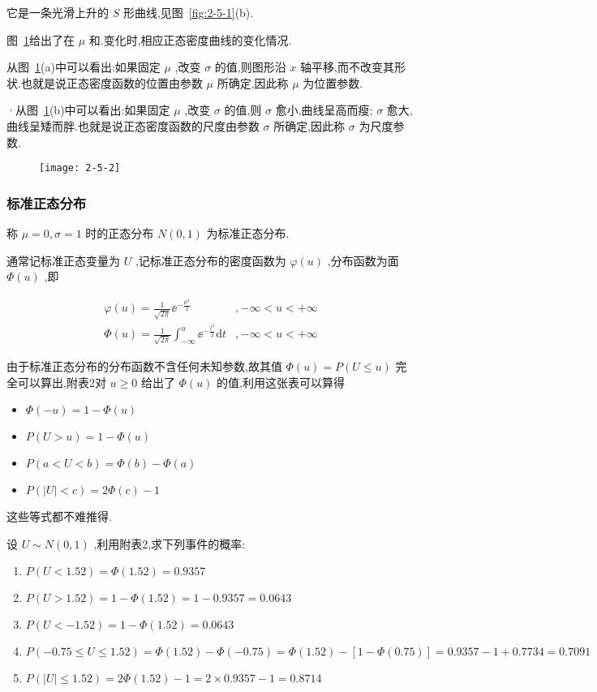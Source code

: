 它是一条光滑上升的 $ S $ 形曲线,见图~\ref{fig:2-5-1}(b).

图~\ref{fig:2-5-2}给出了在 $ \mu $ 和.变化时,相应正态密度曲线的变化情况.

从图~\ref{fig:2-5-2}(a)中可以看出:如果固定 $ \mu $ ,改变 $ \sigma $ 的值,则图形沿 $ x $ 轴平移,而不改变其形状.也就是说正态密度函数的位置由参数 $ \mu $ 所确定,因此称 $ \mu $ 为位置参数.

·从图~\ref{fig:2-5-2}(b)中可以看出:如果固定 $ \mu $ ,改变 $ \sigma $ 的值,则 $ \sigma $ 愈小,曲线呈高而瘦; $ \sigma $ 愈大,曲线呈矮而胖.也就是说正态密度函数的尺度由参数 $ \sigma $ 所确定,因此称 $ \sigma $ 为尺度参数.

\begin{figure}
	\centering
	\texttt{[image: 2-5-2]}
	\caption{}
	\label{fig:2-5-2}
\end{figure}

\subsubsection{标准正态分布}

称 $ \mu=0, \sigma=1 $ 时的正态分布 $ N(0,1) $ 为标准正态分布.

通常记标准正态变量为 $ U $ ,记标准正态分布的密度函数为 $ \varphi(u) $ ,分布函数为面 $ \Phi(u) $ ,即

\[
\begin{array}{ll}
{\varphi(u)=\frac{1}{\sqrt{2 \pi}} \ee ^{-\frac{\mu^{2}}{2}}} & {,-\infty<u<+\infty} \\ 
{\Phi(u)=\frac{1}{\sqrt{2 \pi}} \int_{-\infty}^{u} \ee ^{-\frac{t^{2}}{2}} \mathrm{d} t} & {,-\infty<u<+\infty}
\end{array}
\]

由于标准正态分布的分布函数不含任何未知参数,故其值 $ \Phi(u)=P(U \leqslant u ) $ 完全可以算出,附表2对 $ u \geqslant 0 $ 给出了 $ \Phi(u) $ 的值,利用这张表可以算得
\begin{itemize}
	\item $ \Phi(-u)=1-\Phi(u) $ 
	\item $ P(U>u)=1-\Phi(u) $ 
	\item $ P(a<U<b)=\Phi(b)-\Phi(a) $ 
	\item $ P(|U|<c)=2 \Phi(c)-1 $ 
\end{itemize}

这些等式都不难推得.

\begin{example}
	设 $ U \sim N(0,1) $ ,利用附表2,求下列事件的概率:
	
	\begin{enumerate}
		\item $ P(U<1.52)=\Phi(1.52)=0.9357 $ 
		\item $ P(U>1.52)=1-\Phi(1.52)=1-0.9357=0.0643 $ 
		\item $ P(U<-1.52)=1-\Phi(1.52)=0.0643 $ 
		\item $ P(-0.75 \leqslant U \leqslant 1.52)=\Phi(1.52)-\Phi(-0.75)=\Phi(1.52)-[1- \Phi(0.75) ]=0.9357-1+0.7734=0.7091 $ 
		\item $ P(|U| \leqslant 1.52)=2 \Phi(1.52)-1=2 \times 0.9357-1=0.8714 $ 
	\end{enumerate}
\end{example}

